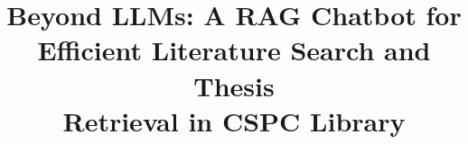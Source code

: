\documentclass[12pt]{cspcccsthesis}
\title{Beyond LLMs: A RAG Chatbot for Efficient Literature Search and Thesis \\Retrieval in CSPC Library}
\begin{document}

%     
%     
%     

\begin{thesisbody}
    
    
    
    
    
    \makeBibliography
\end{thesisbody}
\end{document}
